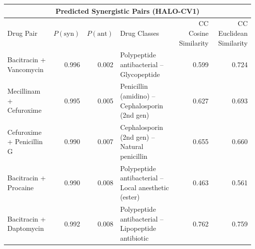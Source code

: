 \documentclass[10pt]{article}
\begin{document}
\begin{table}[t]
    \centering
    \scriptsize
    \setlength{\tabcolsep}{4pt}

    \begin{tabular}{@{} l r r p{5.2cm} r r @{}}
        \toprule
        \multicolumn{6}{c}{\textbf{Predicted Synergistic Pairs (HALO-CV1)}}                                                                 \\
        \midrule
        Drug Pair
                                  & $P(\mathrm{syn})$
                                  & $P(\mathrm{ant})$
                                  & Drug Classes
                                  & CC Cosine Similarity
                                  & CC Euclidean Similarity                                                                                 \\
        \midrule
        Bacitracin + Vancomycin   & 0.996                   & 0.002 & Polypeptide antibacterial -- Glycopeptide             & 0.599 & 0.724 \\
        Mecillinam + Cefuroxime   & 0.995                   & 0.005 & Penicillin (amidino) -- Cephalosporin (2nd gen)       & 0.627 & 0.693 \\
        Cefuroxime + Penicillin G & 0.990                   & 0.007 & Cephalosporin (2nd gen) -- Natural penicillin         & 0.655 & 0.660 \\
        Bacitracin + Procaine     & 0.990                   & 0.008 & Polypeptide antibacterial -- Local anesthetic (ester) & 0.463 & 0.561 \\
        Bacitracin + Daptomycin   & 0.992                   & 0.008 & Polypeptide antibacterial -- Lipopeptide antibiotic   & 0.762 & 0.759 \\
        \bottomrule
    \end{tabular}
\end{table}
\end{document}
